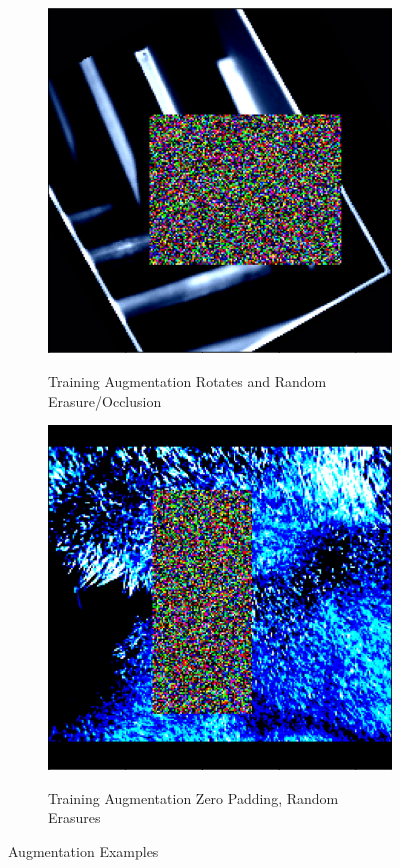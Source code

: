 \begin{figure}[ht!]
\begin{subfigure}[b]{0.2\textwidth}
\includegraphics[width=\textwidth]{figures/research_methadology/augmentation/train_augment.png}
\label{Train_augment}
\caption{Training Augmentation Rotates and Random Erasure/Occlusion}
\end{subfigure}
\hspace{10mm}
\begin{subfigure}[b]{0.2\textwidth}
\includegraphics[width=\textwidth]{figures/research_methadology/augmentation/train_augment_2.png}
\label{Train_augment_2}
\caption{Training Augmentation Zero Padding, Random Erasures}
\end{subfigure}
    \caption{Augmentation Examples}
    \label{fig:aumentation}
\specialrule{0.01em}{1em}{1em}
\end{figure}


